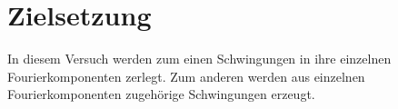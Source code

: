 \section{Zielsetzung}

\label{sec:Zielsetzung}
In diesem Versuch werden zum einen Schwingungen in ihre einzelnen Fourierkomponenten zerlegt.
Zum anderen werden aus einzelnen Fourierkomponenten zugehörige Schwingungen erzeugt.
